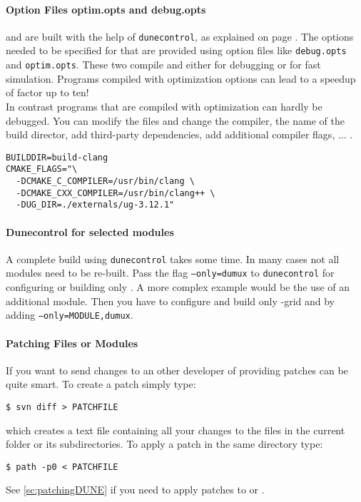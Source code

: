 \paragraph{Option Files optim.opts and debug.opts}
\Dune and \Dumux are built with the help of \texttt{dunecontrol}, as explained on page \pageref{buildIt}.
The options needed to be specified for that are provided using option files like
\texttt{debug.opts} and \texttt{optim.opts}. These two compile \Dune and \Dumux
either for debugging or for fast simulation. Programs compiled with optimization options
can lead to a speedup of factor up to ten!\\
In contrast programs that are compiled with optimization can hardly be debugged.
You can modify the files and change the compiler, the name of the build director,
add third-party dependencies, add additional compiler flags, ... .
\begin{lstlisting}[style=Shell]
BUILDDIR=build-clang
CMAKE_FLAGS="\
  -DCMAKE_C_COMPILER=/usr/bin/clang \
  -DCMAKE_CXX_COMPILER=/usr/bin/clang++ \
  -DUG_DIR=./externals/ug-3.12.1"
\end{lstlisting}

\paragraph{Dunecontrol for selected modules}
A complete build using \texttt{dunecontrol} takes some time. In many cases not all modules need to be re-built.
Pass the flag \texttt{--only=dumux} to \texttt{dunecontrol} for configuring or building only \Dumux. A more
complex example would be the use of an additional module. Then you have to configure and build only \Dune{}-grid
and \Dumux by adding \texttt{--only=MODULE,dumux}.

\paragraph{Patching Files or Modules}
If you want to send changes to an other developer of \Dumux providing patches
can be quite smart. To create a patch simply type:
\begin{lstlisting}[style=Bash]
$ svn diff > PATCHFILE
\end{lstlisting}
\noindent which creates a text file containing all your changes to the files
in the current folder or its subdirectories.
To apply a patch in the same directory type:
\begin{lstlisting}[style=Bash]
$ path -p0 < PATCHFILE
\end{lstlisting}
See \ref{sc:patchingDUNE} if you need to apply patches to \Dumux or \Dune.

